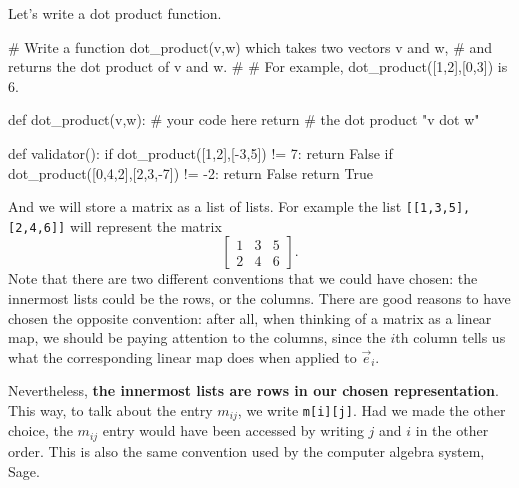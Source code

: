 \documentclass{ximera}
\begin{document}
\begin{exercise}
\begin{solution}
\begin{python}
\end{python}
\end{solution}

Let's write a dot product function.

\begin{solution}
\begin{python}
# Write a function dot_product(v,w) which takes two vectors v and w,
# and returns the dot product of v and w.
#
# For example, dot_product([1,2],[0,3]) is 6.
		
def dot_product(v,w):
  # your code here
  return # the dot product "v dot w"

def validator():
  if dot_product([1,2],[-3,5]) != 7:
    return False
  if dot_product([0,4,2],[2,3,-7]) != -2:
    return False
  return True
\end{python}
\end{solution}

\end{exercise}

And we will store a matrix as a list of lists.  For example the list
\verb|[[1,3,5],[2,4,6]]| will represent the matrix
\[
\begin{bmatrix}
 1 & 3 & 5 \\
 2 & 4 & 6  
\end{bmatrix}.
\]
Note that there are two different conventions that we could have
chosen: the innermost lists could be the rows, or the columns.  There
are good reasons to have chosen the opposite convention: after all,
when thinking of a matrix as a linear map, we should be paying
attention to the columns, since the $i$th column tells us what the
corresponding linear map does when applied to $\vec{e}_i$.

Nevertheless, \textbf{the innermost lists are rows in our chosen
  representation}.  This way, to talk about the entry $m_{ij}$, we
write \verb|m[i][j]|.  Had we made the other choice, the $m_{ij}$
entry would have been accessed by writing $j$ and $i$ in the other
order.  This is also the same convention used by the computer algebra
system, Sage.
\end{document}
